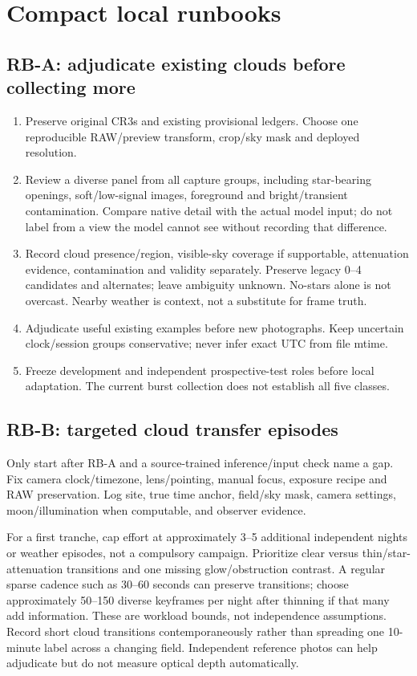 \documentclass[11pt,a4paper]{article}
\begin{document}
\section{Compact local runbooks}
\subsection{RB-A: adjudicate existing clouds before collecting more}
\begin{enumerate}
\item Preserve original CR3s and existing provisional ledgers. Choose one
reproducible RAW/preview transform, crop/sky mask and deployed resolution.
\item Review a diverse panel from all capture groups, including star-bearing
openings, soft/low-signal images, foreground and bright/transient contamination.
Compare native detail with the actual model input; do not label from a view
the model cannot see without recording that difference.
\item Record cloud presence/region, visible-sky coverage if supportable,
attenuation evidence, contamination and validity separately. Preserve legacy
0--4 candidates and alternates; leave ambiguity unknown. No-stars alone is
not overcast. Nearby weather is context, not a substitute for frame truth.
\item Adjudicate useful existing examples before new photographs. Keep uncertain
clock/session groups conservative; never infer exact UTC from file mtime.
\item Freeze development and independent prospective-test roles before local
adaptation. The current burst collection does not establish all five classes.
\end{enumerate}

\subsection{RB-B: targeted cloud transfer episodes}
Only start after RB-A and a source-trained inference/input check name a gap.
Fix camera clock/timezone, lens/pointing, manual focus, exposure recipe and RAW
preservation. Log site, true time anchor, field/sky mask, camera settings,
moon/illumination when computable, and observer evidence.

For a first tranche, cap effort at approximately 3--5 additional independent
nights or weather episodes, not a compulsory campaign. Prioritize clear versus
thin/star-attenuation transitions and one missing glow/obstruction contrast.
A regular sparse cadence such as 30--60 seconds can preserve transitions;
choose approximately 50--150 diverse keyframes per night after thinning if that
many add information. These are workload bounds, not independence assumptions.
Record short cloud transitions contemporaneously rather than spreading one
10-minute label across a changing field. Independent reference photos can
help adjudicate but do not measure optical depth automatically.
\end{document}
